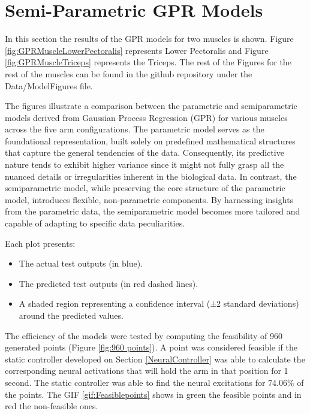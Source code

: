\cleardoublepage
\section{Semi-Parametric GPR Models}

In this section the results of the GPR models for two muscles is shown. Figure \ref{fig:GPRMuscleLowerPectoralis} represents Lower Pectoralis and Figure \ref{fig:GPRMuscleTriceps} represents the Triceps. The rest of the Figures for the rest of the muscles can be found in the github repository under the Data/ModelFigures file. 

The figures illustrate a comparison between the parametric and semiparametric models derived from Gaussian Process Regression (GPR) for various muscles across the five arm configurations. The parametric model serves as the foundational representation, built solely on predefined mathematical structures that capture the general tendencies of the data. Consequently, its predictive nature tends to exhibit higher variance since it might not fully grasp all the nuanced details or irregularities inherent in the biological data. In contrast, the semiparametric model, while preserving the core structure of the parametric model, introduces flexible, non-parametric components. By harnessing insights from the parametric data, the semiparametric model becomes more tailored and capable of adapting to specific data peculiarities.

Each plot presents:
\begin{itemize}
    \item The actual test outputs (in blue).
    \item The predicted test outputs (in red dashed lines).
    \item A shaded region representing a confidence interval (±2 standard deviations) around the predicted values.
\end{itemize}

The efficiency of the models were tested by computing the feasibility of 960 generated points (Figure \ref{fig:960 points}). A point was considered feasible if the static controller developed on Section \ref{NeuralController} was able to calculate the corresponding neural activations that will hold the arm in that position for 1 second. The static controller was able to find the neural excitations for 74.06\% of the points. The GIF \ref{gif:Feasiblepoints} shows in green the feasible points and in red the non-feasible ones.


